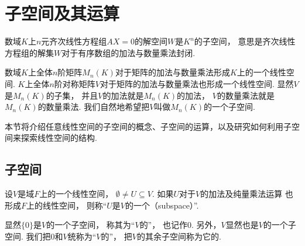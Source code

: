 \section{子空间及其运算}
数域\(K\)上\(n\)元齐次线性方程组\(A X = 0\)的解空间\(W\)是\(K^n\)的子空间，
意思是齐次线性方程组的解集\(W\)对于有序数组的加法与数量乘法封闭.

数域\(K\)上全体\(n\)阶矩阵\(M_n(K)\)对于矩阵的加法与数量乘法形成\(K\)上的一个线性空间.
\(K\)上全体\(n\)阶对称矩阵\(V\)对于矩阵的加法与数量乘法也形成一个线性空间.
显然\(V\)是\(M_n(K)\)的子集，
并且\(V\)的加法就是\(M_n(K)\)的加法，
\(V\)的数量乘法就是\(M_n(K)\)的数量乘法.
我们自然地希望把\(V\)叫做\(M_n(K)\)的一个子空间.

本节将介绍任意线性空间的子空间的概念、子空间的运算，以及研究如何利用子空间来探索线性空间的结构.

\subsection{子空间}
\begin{definition}
设\(V\)是域\(F\)上的一个线性空间，
\(\emptyset\neq U\subseteq V\).
如果\(U\)对于\(V\)的加法及纯量乘法运算
也形成\(F\)上的线性空间，
则称“\(U\)是\(V\)的一个（subspace）”.
\end{definition}

显然\(\{0\}\)是\(V\)的一个子空间，
称其为“\(V\)的”，
也记作\(0\).
另外，\(V\)显然也是\(V\)的一个子空间.
我们把\(0\)和\(V\)统称为“\(V\)的”，
把\(V\)的其余子空间称为它的.

